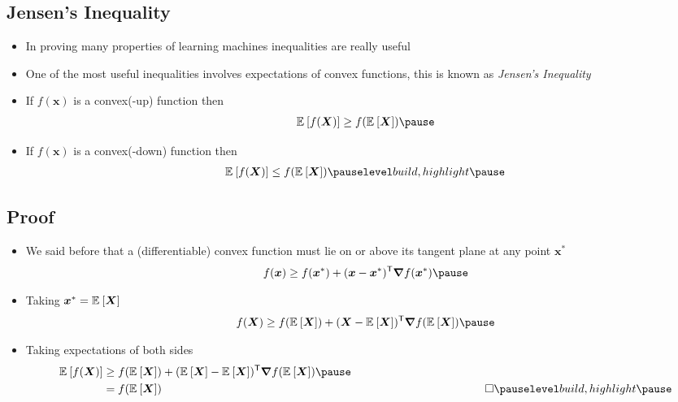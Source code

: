 \begin{slide}
\section{Jensen's Inequality}

\begin{PauseHighLight}
  \begin{itemize}
  \item In proving many properties of learning machines inequalities
    are really useful\pause
  \item One of the most useful inequalities involves expectations of
    convex functions, this is known as \emph{Jensen's
      Inequality}\pause
  \item If $f(\bm{x})$ is a convex(-up) function then
    \begin{align*}
      \av{f(\bm{X})} \geq f(\av{\bm{X}})\pause
    \end{align*}
  \item If $f(\bm{x})$ is a convex(-down) function then
    \begin{align*}
      \av{f(\bm{X})} \leq f(\av{\bm{X}})\pauseb
    \end{align*}
  \end{itemize}
\end{PauseHighLight}

\end{slide}


\begin{slide}
\section{Proof}

\begin{PauseHighLight}
  \begin{itemize}
  \item We said before that a (differentiable) convex function must
    lie on or above its tangent plane at any point $\bm{x}^*$
    \begin{align*}
      f(\bm{x}) \geq f(\bm{x}^*) + (\bm{x}-\bm{x}^*)^\tr \grad f(\bm{x}^*)\pause
    \end{align*}
  \item Taking $\bm{x}^*=\mathbb{E}_{}\left[ \bm{X} \right]$
    \begin{align*}
      f(\bm{X}) \geq f(\av{\bm{X}}) + (\bm{X}-\av{\bm{X}})^\tr \grad f(\av{\bm{X}})\pause
    \end{align*}
  \item Taking expectations of both sides
    \begin{align*}
      \av{f(\bm{X})}
      &\geq f(\av{\bm{X}}) +
      (\av{\bm{X}}-\av{\bm{X}})^\tr \grad f(\av{\bm{X}})\pause\\
      &= f(\av{\bm{X}}) \hspace{10cm} \square\pauseb
    \end{align*}
  \end{itemize}
\end{PauseHighLight}

\end{slide}

